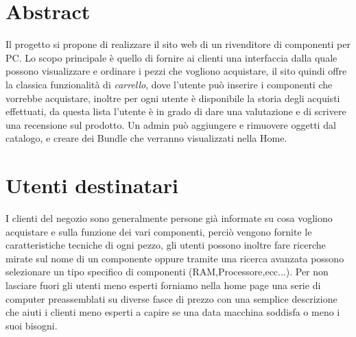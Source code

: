 \section{Abstract}
Il progetto si propone di realizzare il sito web di un rivenditore di componenti per PC.
Lo scopo principale è quello di fornire ai clienti una interfaccia dalla quale possono visualizzare e ordinare i pezzi che vogliono acquistare, il sito quindi offre la classica funzionalità di \emph{carrello}, dove l'utente può inserire i componenti che vorrebbe acquistare, inoltre per ogni utente è disponibile la storia degli acquisti effettuati, da questa lista l'utente è in grado di dare una valutazione e di scrivere una recensione sul prodotto.
Un admin può aggiungere e rimuovere oggetti dal catalogo, e creare dei Bundle che verranno visualizzati nella Home.
\section{Utenti destinatari}
I clienti del negozio sono generalmente persone già informate su cosa vogliono acquistare e sulla funzione dei vari componenti, perciò vengono fornite le caratteristiche tecniche di ogni pezzo, gli utenti possono inoltre fare ricerche mirate sul nome di un componente oppure tramite una ricerca avanzata possono selezionare un tipo specifico di componenti (RAM,Processore,ecc...).
Per non lasciare fuori gli utenti meno esperti forniamo nella home page una serie di computer preassemblati su diverse fasce di prezzo con una semplice descrizione che aiuti i clienti meno esperti a capire se una data macchina soddisfa o meno i suoi bisogni.